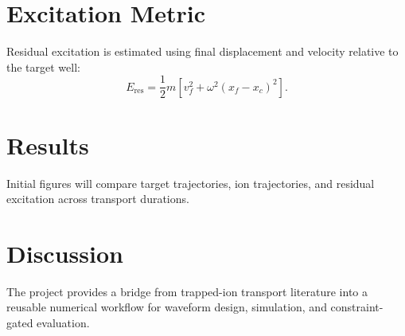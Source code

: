 \documentclass[11pt]{article}
\begin{document}
\section{Excitation Metric}

Residual excitation is estimated using final displacement and velocity relative to the target well:
\[
E_{\mathrm{res}} =
\frac{1}{2}m\left[v_f^2+\omega^2(x_f-x_c)^2\right].
\]

\section{Results}

Initial figures will compare target trajectories, ion trajectories, and residual excitation across transport durations.

\section{Discussion}

The project provides a bridge from trapped-ion transport literature into a reusable numerical workflow for waveform design, simulation, and constraint-gated evaluation.



\end{document}
